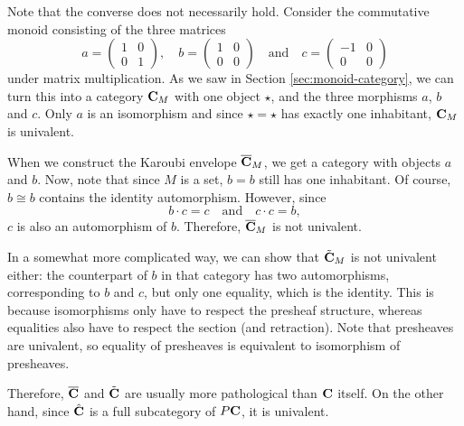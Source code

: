 \begin{remark}\label{rem:karoubi-not-univalent}
  Note that the converse does not necessarily hold. Consider the commutative monoid consisting of the three matrices
  \[
    a = \begin{pmatrix}
      1 & 0\\0 & 1
    \end{pmatrix}, \quad
    b = \begin{pmatrix}
      1 & 0\\0 & 0
    \end{pmatrix} \quad \text{and} \quad
    c = \begin{pmatrix}
      -1 & 0\\0 & 0
    \end{pmatrix}
  \]
  under matrix multiplication. As we saw in Section \ref{sec:monoid-category}, we can turn this into a category $ \mathbf{C}_M $ with one object $ \star $, and the three morphisms $ a $, $ b $ and $ c $. Only $ a $ is an isomorphism and since $ \star = \star $ has exactly one inhabitant, $ \mathbf{C}_M $ is univalent.

  When we construct the Karoubi envelope $ \overline {\mathbf{C}}_M $, we get a category with objects $ a $ and $ b $. Now, note that since $ M $ is a set, $ b = b $ still has one inhabitant. Of course, $ b \cong b $ contains the identity automorphism. However, since
  \[ b \cdot c = c \quad \text{and} \quad c \cdot c = b, \]
  $ c $ is also an automorphism of $ b $. Therefore, $ \overline {\mathbf{C}}_M $ is not univalent.

  In a somewhat more complicated way, we can show that $ \tilde {\mathbf{C}}_M $ is not univalent either: the counterpart of $ b $ in that category has two automorphisms, corresponding to $ b $ and $ c $, but only one equality, which is the identity. This is because isomorphisms only have to respect the presheaf structure, whereas equalities also have to respect the section (and retraction). Note that presheaves are univalent, so equality of presheaves is equivalent to isomorphism of presheaves.

  Therefore, $ \overline {\mathbf{C}} $ and $ \tilde {\mathbf{C}} $ are usually more pathological than $ \mathbf{C} $ itself. On the other hand, since $ \hat {\mathbf{C}} $ is a full subcategory of $ P\mathbf{C} $, it is univalent.
\end{remark}

